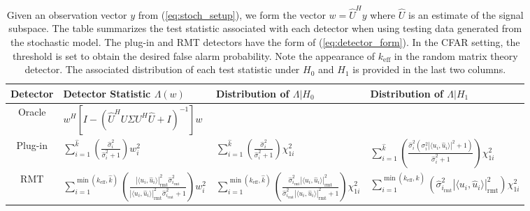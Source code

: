 \begin{table}[t]
\centering
\begin{tabular}{clll}\toprule
 Detector & Detector Statistic $\Lambda(w)$  & Distribution  of $\Lambda|H_0$ & Distribution of $\Lambda|H_1$\\
\midrule
Oracle & $ w^H\left[I-\left(\widehat{U}^HU\Sigma U^H\widehat{U}+I\right)^{-1}\right]w$ &  & \\
Plug-in & $\sum_{i=1}^{\widehat{k}}\left(\frac{\widehat{\sigma}_i^2}{\widehat{\sigma}_i^2+1}\right)w_i^2$ & $\sum_{i=1}^{\widehat{k}}\left(\frac{\widehat{\sigma}_i^2}{\widehat{\sigma}_i^2+1}\right)\chi^2_{1i}$ & $\sum_{i=1}^{\widehat{k}}\left(\frac{\widehat{\sigma}_i^2\left(\sigma^2_i|\langle u_i,\widehat{u}_i\rangle|^2+1\right)}{\widehat{\sigma}_i^2+1}\right)\chi^2_{1i}$\\
 RMT & $\sum_{i=1}^{\min(k_\text{eff},\widehat{k})}\left(\frac{|\langle u_i,\widehat{u}_i\rangle|^2_{\text{rmt}}\widehat{\sigma}_{i_\text{rmt}}^2}{|\langle u_i,\widehat{u}_i\rangle|^2_{\text{rmt}}\widehat{\sigma}_{i_\text{rmt}}^2+1 }\right)w_i^2$ & $\sum_{i=1}^{\min(k_\text{eff},\widehat{k})}\left(\frac{\widehat{\sigma}_{i_\text{rmt}}^2|\langle u_i,\widehat{u}_i\rangle|^2_{\text{rmt}}}{\widehat{\sigma}_{i_\text{rmt}}^2|\langle u_i,\widehat{u}_i\rangle|^2_{\text{rmt}}+1}\right)\chi^2_{1i}$ & $\sum_{i=1}^{\min(k_\text{eff},\widehat{k})}\left(\widehat{\sigma}^2_{i_\text{rmt}}|\langle u_i,\widehat{u}_i\rangle|^2_{\text{rmt}}\right)\chi^2_{1i}$\\
\bottomrule
\end{tabular}
\caption{Given an observation vector $y$ from (\ref{eq:stoch_setup}), we form the vector $w=\widehat{U}^Hy$ where $\widehat{U}$ is an estimate of the signal subspace. The table summarizes the test statistic associated with each detector when using testing data generated from the stochastic model. The plug-in and RMT detectors have the form of (\ref{eq:detector_form}). In the CFAR setting, the threshold is  set to obtain the desired false alarm probability. Note the appearance of $k_\text{eff}$ in the random matrix theory detector. The associated distribution of each test statistic under $H_0$ and $H_1$ is provided in the last two columns.}\vskip-0.2cm
\label{table:summary_stoch}
\end{table}

